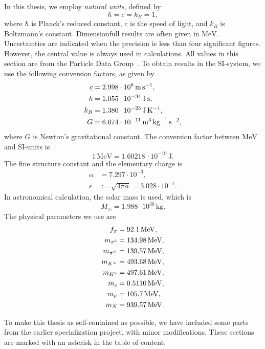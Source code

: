 In this thesis, we employ \emph{natural units}, defined by
%
\begin{equation}
    \hbar = c = k_B = 1,
\end{equation}
%
where $\hbar$ is Planck's reduced constant, $c$ is the speed of light, and $k_B$ is Boltzmann's constant.
Dimensionfull results are often given in $\text{MeV}$.
Uncertainties are indicated when the precision is less than four significant figures. 
However, the central value is always used in calculations.
All values in this section are from the Particle Data Group~\cite{particledatagroupReviewParticlePhysics2020}.
To obtain results in the SI-system, we use the following conversion factors, as given by
%
\begin{align}
    \label{speed of ligh}
    c       &= 2.998 \cdot 10^8     \, \text{m} \, \text{s}^{-1}, \\
    \label{hbar}
    \hbar   &= 1.055 \cdot 10^{-34} \, \text{J} \, \text{s}, \\
    \label{Boltzmanns constat}
    k_B     &= 1.380 \cdot 10^{-23} \, \text{J} \, \text K^{-1}, \\
    \label{Newtons gravitational constant}
    G       &= 6.674 \cdot 10^{-11} \, \text m^3 \, \text{kg}^{-1} \, \text s^{-2},
\end{align}
%
where $G$ is Newton's gravitational constant.
The conversion factor between $\text{MeV}$ and SI-units is
%
\begin{equation}
    \label{electronvolt}
    1 \, \text{MeV} = 1.60218\, \cdot 10^{-19} \, \text{J}. 
\end{equation}
%
The fine structure constant and the elementary charge is
%
\begin{align}
    \label{Fine structure constant}
    \alpha &= 7.297 \cdot 10^{-3}, \\
    \label{Elementary charge}
    e &:= \sqrt{4 \pi \alpha} =  3.028\cdot 10^{-1}.
\end{align}
%
In astronomical calculation, the solar mass is used, which is
%
\begin{equation}
    \label{solar mass}
    M_\odot = 1.988 \cdot 10^{30} \, \text{kg}.
\end{equation}
%
The physical parameters we use are
%
\begingroup
\allowdisplaybreaks %
\begin{align}
    \label{pion decay constant}
    f_\pi & =  92.1 \, \text{MeV}, \\
    \label{pion mass}
    m_{\pi^0} & = 134.98 \, \text{MeV}, \\
    \label{charged pion mass}
    m_{{\pi^\pm}} &= 139.57 \, \text{MeV}, \\
    m_{{K^\pm}} & = 493.68\,\text{MeV}, \\
    m_{{K^0}} & = 497.61\,\text{MeV}, \\
    m_e &= 0.5110 \, \text{MeV}, \\
    m_\mu &= 105.7 \, \text{MeV}, \\
    \label{mass of neutron}
    m_N &= 939.57 \, \text{MeV}.
\end{align}
\endgroup

To make this thesis as self-contained as possible, we have included some parts from the earlier specialization project, with minor modifications.
These sections are marked with an asterisk in the table of content.
